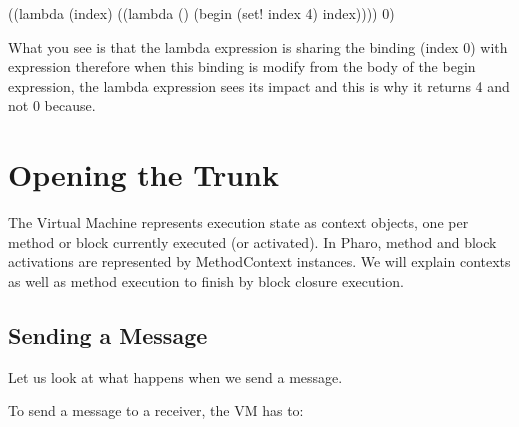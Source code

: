 \documentclass[a4paper,10pt,twoside]{book}
\begin{document}
\begin{code}{}
((lambda (index)
   ((lambda () (begin
                (set! index 4)
                index))))
 0)
\end{code}


What you see is that the lambda expression is sharing the binding (index 0) with expression 
therefore when this binding is modify from the body of the begin expression, the lambda expression sees its impact
and this is why it returns 4 and not 0 because.



\section{Opening the Trunk}
The Virtual Machine represents execution state as context objects, one per method or block currently executed (or activated). In Pharo, method and block activations are represented by MethodContext instances.
We will explain contexts as well as method execution to finish by block closure execution.




\subsection{Sending a Message}
Let us look at what happens when we send a message.

To send a message to a receiver, the VM has to:
\end{document}
